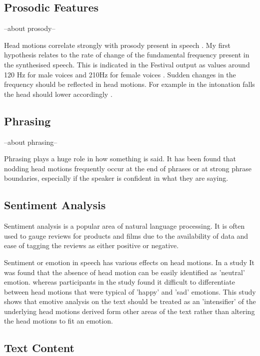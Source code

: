 \documentclass[bsc,frontabs,twoside,singlespacing,parskip]{infthesis}
\begin{document}
\subsection{Prosodic Features}

--about prosody-- 

Head motions correlate strongly with prosody present in speech \cite{vis_prosody}. My first hypothesis relates to the rate of change of the fundamental frequency present in the synthesised speech. This is indicated in the Festival output as values around 120 Hz for male voices and 210Hz for female voices \cite{f0_values}. Sudden changes in the frequency should be reflected in head motions. For example in the intonation falls the head should lower accordingly \cite{Kendon}.

\subsection{Phrasing}

--about phrasing--

Phrasing plays a huge role in how something is said. It has been found that nodding head motions frequently occur at the end of phrases or at strong phrase boundaries, especially if the speaker is confident in what they are saying. \cite{ishi2008}  

\subsection{Sentiment Analysis}

Sentiment analysis is a popular area of natural language processing. It is often used to gauge reviews for products\cite{sentiment_online} and films\cite{sentiment_films} due to the availability of data and ease of tagging the reviews as either positive or negative.

Sentiment or emotion in speech has various effects on head motions. In a study It was found that the absence of head motion can be easily identified as 'neutral' emotion. \cite{emotion_head_motion} whereas participants in the study found it difficult to differentiate between head motions that were typical of 'happy' and 'sad' emotions. This study shows that emotive analysis on the text should be treated as an 'intensifier' of the underlying head motions derived form other areas of the text rather than altering the head motions to fit an emotion.



\subsection{Text Content}
\end{document}
